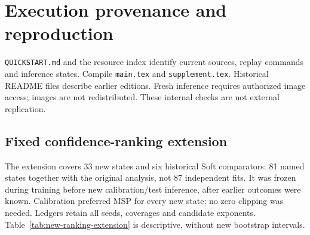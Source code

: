 \documentclass[10pt]{article}
\begin{document}
\clearpage\section{Execution provenance and reproduction}\label{supp:provenance}


\texttt{QUICKSTART.md} and the resource index identify current sources, replay commands and inference states. Compile \texttt{main.tex} and \texttt{supplement.tex}. Historical README files describe earlier editions. Fresh inference requires authorized image access; images are not redistributed. These internal checks are not external replication.





\subsection{Fixed confidence-ranking extension}
The extension covers 33 new states and six historical Soft comparators: 81 named states together with the original analysis, not 87 independent fits. It was frozen during training before new calibration/test inference, after earlier outcomes were known. Calibration preferred MSP for every new state; no zero clipping was needed. Ledgers retain all seeds, coverages and candidate exponents. Table~\ref{tab:new-ranking-extension} is descriptive, without new bootstrap intervals.
\begingroup\setlength{\LTcapwidth}{\linewidth}

\endgroup
\end{document}
